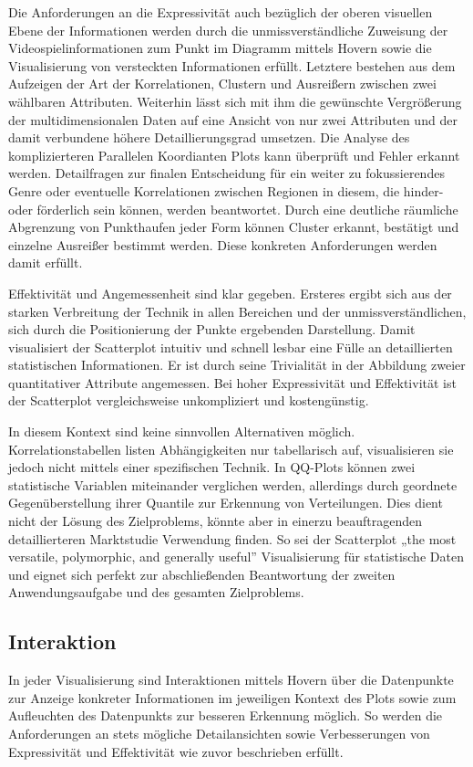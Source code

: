 \documentclass[usegeometry=true]{scrartcl}
\begin{document}
Die Anforderungen an die Expressivität auch bezüglich der oberen visuellen Ebene der Informationen werden durch die 
unmissverständliche Zuweisung der Videospielinformationen zum Punkt im Diagramm mittels Hovern sowie die Visualisierung von versteckten Informationen erfüllt. 
Letztere bestehen aus dem Aufzeigen der Art der Korrelationen, Clustern und Ausreißern zwischen zwei wählbaren Attributen.
Weiterhin lässt sich mit ihm die gewünschte Vergrößerung der multidimensionalen Daten auf eine Ansicht von nur zwei Attributen und der damit verbundene höhere Detaillierungsgrad umsetzen. 
Die Analyse des komplizierteren Parallelen Koordianten Plots kann überprüft und Fehler erkannt werden. 
Detailfragen zur finalen Entscheidung für ein weiter zu fokussierendes Genre oder eventuelle Korrelationen zwischen Regionen in diesem, 
die hinder- oder förderlich sein können, werden beantwortet. 
Durch eine deutliche räumliche Abgrenzung von Punkthaufen jeder Form können Cluster erkannt, bestätigt und einzelne Ausreißer bestimmt werden.
Diese konkreten Anforderungen werden damit erfüllt.

Effektivität und Angemessenheit sind klar gegeben. 
Ersteres ergibt sich aus der starken Verbreitung der Technik in allen Bereichen und der unmissverständlichen, sich durch die Positionierung der Punkte ergebenden Darstellung. 
Damit visualisiert der Scatterplot intuitiv und schnell lesbar eine Fülle an detaillierten statistischen Informationen.
Er ist durch seine Trivialität in der Abbildung zweier quantitativer Attribute angemessen. 
Bei hoher Expressivität und Effektivität ist der Scatterplot vergleichsweise unkompliziert und kostengünstig.

In diesem Kontext sind keine sinnvollen Alternativen möglich. 
Korrelationstabellen listen Abhängigkeiten nur tabellarisch auf, visualisieren sie jedoch nicht mittels einer spezifischen Technik.
In QQ-Plots können zwei statistische Variablen miteinander verglichen werden, allerdings durch geordnete Gegenüberstellung ihrer Quantile zur Erkennung von Verteilungen.
Dies dient nicht der Lösung des Zielproblems, könnte aber in einerzu beauftragenden detaillierteren Marktstudie Verwendung finden.
So sei der Scatterplot „the most versatile, polymorphic, and generally useful”\cite[103]{Friendly.2005} Visualisierung für statistische Daten und 
eignet sich perfekt zur abschließenden Beantwortung der zweiten Anwendungsaufgabe und des gesamten Zielproblems.

\subsection{Interaktion}
In jeder Visualisierung sind Interaktionen mittels Hovern über die Datenpunkte zur Anzeige konkreter Informationen im jeweiligen Kontext des Plots 
sowie zum Aufleuchten des Datenpunkts zur besseren Erkennung möglich.
So werden die Anforderungen an stets mögliche Detailansichten sowie Verbesserungen von Expressivität und Effektivität wie zuvor beschrieben erfüllt. 
\end{document}
